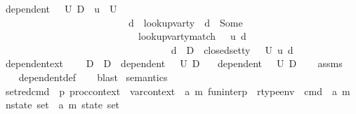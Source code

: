 \begin{isabellebody}
\ {\isachardoublequoteopen}dependent\ {\isasymLambda}\ {\isasymOmega}\ U\ D\ {\isacharequal}{\kern0pt}\ {\isacharparenleft}{\kern0pt}{\isasymforall}u\ {\isasymin}\ U{\isachardot}{\kern0pt}\ \isanewline
\ \ \ \ \ \ \ \ \ \ \ \ \ \ \ \ \ \ \ \ \ \ \ \ \ \ {\isacharparenleft}{\kern0pt}{\isasymforall}d\ {\isasymtau}{\isachardot}{\kern0pt}\ lookup{\isacharunderscore}{\kern0pt}var{\isacharunderscore}{\kern0pt}ty\ {\isasymLambda}\ d\ {\isacharequal}{\kern0pt}\ Some\ {\isasymtau}\ {\isasymlongrightarrow}\isanewline
\ \ \ \ \ \ \ \ \ \ \ \ \ \ \ \ \ \ \ \ \ \ \ \ \ \ \ \ {\isacharparenleft}{\kern0pt}lookup{\isacharunderscore}{\kern0pt}var{\isacharunderscore}{\kern0pt}ty{\isacharunderscore}{\kern0pt}match\ {\isasymLambda}\ {\isasymOmega}\ u\ d\ {\isasymtau}{\isacharparenright}{\kern0pt}\ {\isasymand}\ \ \ \ \ \ \ \ \ \ \ \ \ \ \ \ \ \ \ \ \ \ \ \ \ \ \isanewline
\ \ \ \ \ \ \ \ \ \ \ \ \ \ \ \ \ \ \ \ \ \ \ \ \ \ \ \ {\isacharparenleft}{\kern0pt}d\ {\isasymnotin}\ D\ {\isasymlongrightarrow}\ closed{\isacharunderscore}{\kern0pt}set{\isacharunderscore}{\kern0pt}ty\ {\isasymLambda}\ {\isasymOmega}\ U\ u\ d\ {\isasymtau}{\isacharparenright}{\kern0pt}{\isacharparenright}{\kern0pt}{\isacharparenright}{\kern0pt}{\isachardoublequoteclose}\isanewline
\ \ \isanewline
{}\isamarkupfalse%
\ dependent{\isacharunderscore}{\kern0pt}ext{\isacharcolon}{\kern0pt}\ \isanewline
\ \ \ {\isachardoublequoteopen}D\ {\isasymsubseteq}\ D{\isacharprime}{\kern0pt}{\isachardoublequoteclose}\ \ {\isachardoublequoteopen}dependent\ {\isasymLambda}\ {\isasymOmega}\ U\ D{\isachardoublequoteclose}\isanewline
\ \ \ {\isachardoublequoteopen}dependent\ {\isasymLambda}\ {\isasymOmega}\ U\ D{\isacharprime}{\kern0pt}{\isachardoublequoteclose}\isanewline
%
\isadelimproof
\ \ %
\endisadelimproof
%
\isatagproof
{}\isamarkupfalse%
\ assms\isanewline
\ \ \isamarkupfalse%
\ dependent{\isacharunderscore}{\kern0pt}def\isanewline
\ \ \isamarkupfalse%
\ blast%
\endisatagproof
{\isafoldproof}%
%
\isadelimproof
\isanewline
%
\endisadelimproof
\isanewline
\isanewline
{}\isamarkupfalse%
\ semantics\ \isanewline
\isanewline
{}\isamarkupfalse%
\ set{\isacharunderscore}{\kern0pt}red{\isacharunderscore}{\kern0pt}cmd\ {\isacharcolon}{\kern0pt}{\isacharcolon}{\kern0pt}\ {\isachardoublequoteopen}{\isacharprime}{\kern0pt}p\ proc{\isacharunderscore}{\kern0pt}context\ {\isasymRightarrow}\ var{\isacharunderscore}{\kern0pt}context\ {\isasymRightarrow}\ {\isacharparenleft}{\kern0pt}{\isacharprime}{\kern0pt}a{\isacharcomma}{\kern0pt}\ {\isacharprime}{\kern0pt}m{\isacharparenright}{\kern0pt}\ fun{\isacharunderscore}{\kern0pt}interp\ {\isasymRightarrow}\ rtype{\isacharunderscore}{\kern0pt}env\ {\isasymRightarrow}\ cmd\ {\isasymRightarrow}\ {\isacharparenleft}{\kern0pt}{\isacharprime}{\kern0pt}a{\isacharcomma}{\kern0pt}\ {\isacharprime}{\kern0pt}m{\isacharparenright}{\kern0pt}\ nstate\ set\ {\isasymRightarrow}\ {\isacharparenleft}{\kern0pt}{\isacharprime}{\kern0pt}a{\isacharcomma}{\kern0pt}\ {\isacharprime}{\kern0pt}m{\isacharparenright}{\kern0pt}\ state\ set{\isachardoublequoteclose}\isanewline

\end{isabellebody}

